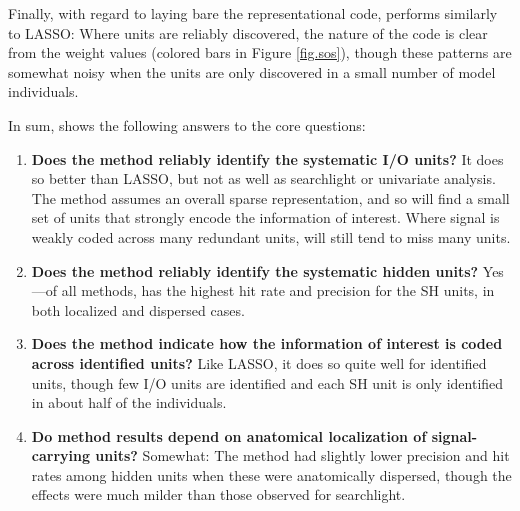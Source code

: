 Finally, with regard to laying bare the representational code, \soslasso performs similarly to LASSO: Where units are reliably discovered, the nature of the code is clear from the weight values (colored bars in Figure \ref{fig.sos}), though these patterns are somewhat noisy when the units are only discovered in a small number of model individuals.

In sum, \soslasso shows the following answers to the core questions: 

\begin{enumerate}
\item {\bf Does the method reliably identify the systematic I/O units?} It does so better than LASSO, but not as well as searchlight or univariate analysis. The method assumes an overall sparse representation, and so will find a small set of units that strongly encode the information of interest. Where signal is weakly coded across many redundant units, \soslasso will still tend to miss many units.
\item {\bf Does the method reliably identify the systematic hidden units?} Yes---of all methods, \soslasso has the highest hit rate and precision for the SH units, in both localized and dispersed cases.
\item {\bf Does the method indicate how the information of interest is coded across identified units?} Like LASSO, it does so quite well for identified units, though few I/O units are identified and each SH unit is only identified in about half of the individuals.
\item {\bf Do method results depend on anatomical localization of signal-carrying units?} Somewhat: The method had slightly lower precision and hit rates among hidden units when these were anatomically dispersed, though the effects were much milder than those observed for searchlight.
\end{enumerate}